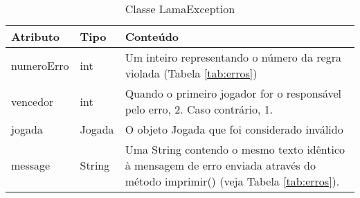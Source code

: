 \documentclass[10pt]{article}
\begin{document}
\renewcommand{\arraystretch}{1.15}
\begin{table}[h]
\centering
\caption{Classe LamaException}
\label{tab:lamaexception}
\begin{tabular}{|l|l|p{8cm}|}
\hline
Atributo            & Tipo      & Conteúdo \\ \hline
numeroErro              & int       & Um inteiro representando o número da regra violada (Tabela \ref{tab:erros}) \\ \hline
vencedor            & int       & Quando o primeiro jogador for o responsável pelo erro, 2. Caso contrário, 1.\\ \hline
jogada      & Jogada    & O objeto Jogada que foi considerado inválido \\ \hline
message        & String    & Uma String contendo o mesmo texto idêntico à mensagem de erro enviada através do método imprimir() (veja Tabela \ref{tab:erros}). \\ \hline
\end{tabular}
\end{table}
\end{document}

